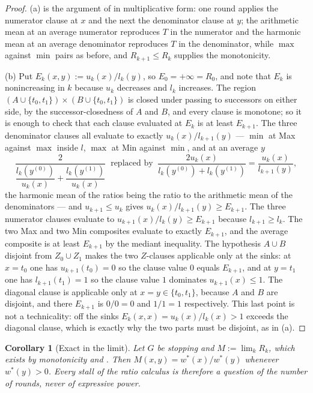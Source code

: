 \documentclass[11pt]{article}
\theoremstyle{plain}
\newtheorem{corollary}[theorem]{Corollary}
\theoremstyle{definition}
\begin{document}
\begin{proof}
(a) is the argument of  in multiplicative form:
one round applies the numerator clause at $x$ and the next the
denominator clause at $y$; the arithmetic mean at an average numerator
reproduces $T$ in the numerator and the harmonic mean at an average
denominator reproduces $T$ in the denominator, while $\max$ against
$\min$ pairs as before, and $R_{k+1}\le R_k$ supplies the monotonicity.

(b) Put $E_k(x,y):=u_k(x)/l_k(y)$, so $E_0=+\infty=R_0$, and note that
$E_k$ is nonincreasing in $k$ because $u_k$ decreases and $l_k$
increases. The region $(A\cup\{t_0,t_1\})\times(B\cup\{t_0,t_1\})$ is
closed under passing to successors on either side, by the
successor-closedness of $A$ and $B$, and every clause is monotone; so it
is enough to check that each clause evaluated at $E_k$ is at least
$E_{k+1}$. The three denominator clauses all evaluate to exactly
$u_k(x)/l_{k+1}(y)$ --- $\min$ at Max against $\max$ inside $l$, $\max$
at Min against $\min$, and at an average $y$
\[
  \frac{2}{\dfrac{l_k(y^{(0)})}{u_k(x)}+\dfrac{l_k(y^{(1)})}{u_k(x)}}
  \ \text{ replaced by }\
  \frac{2u_k(x)}{l_k(y^{(0)})+l_k(y^{(1)})}=\frac{u_k(x)}{l_{k+1}(y)},
\]
the harmonic mean of the ratios being the ratio to the arithmetic mean of
the denominators --- and $u_{k+1}\le u_k$ gives
$u_k(x)/l_{k+1}(y)\ge E_{k+1}$. The three numerator clauses evaluate to
$u_{k+1}(x)/l_k(y)\ge E_{k+1}$ because $l_{k+1}\ge l_k$. The two Max and
two Min composites evaluate to exactly $E_{k+1}$, and the average
composite is at least $E_{k+1}$ by the mediant inequality. The
hypothesis $A\cup B$ disjoint from $Z_0\cup Z_1$ makes the two
$Z$-clauses applicable only at the sinks: at $x=t_0$ one has
$u_{k+1}(t_0)=0$ so the clause value $0$ equals $E_{k+1}$, and at
$y=t_1$ one has $l_{k+1}(t_1)=1$ so the clause value $1$ dominates
$u_{k+1}(x)\le1$. The diagonal clause is applicable only at
$x=y\in\{t_0,t_1\}$, because $A$ and $B$ are disjoint, and there
$E_{k+1}$ is $0/0=0$ and $1/1=1$ respectively. This last point is not a
technicality: off the sinks $E_k(x,x)=u_k(x)/l_k(x)>1$ exceeds the
diagonal clause, which is exactly why the two parts must be disjoint,
as in \Cref{cor:separable}(a).
\end{proof}

\begin{corollary}[Exact in the limit]\label{cor:ratio-complete}
Let $G$ be stopping and $M:=\lim_kR_k$, which exists by monotonicity and
\Cref{thm:ratio-sound}. Then $M(x,y)=w^\ast(x)/w^\ast(y)$ whenever
$w^\ast(y)>0$. Every stall of the ratio calculus is therefore a question
of the number of rounds, never of expressive power.
\end{corollary}
\end{document}
